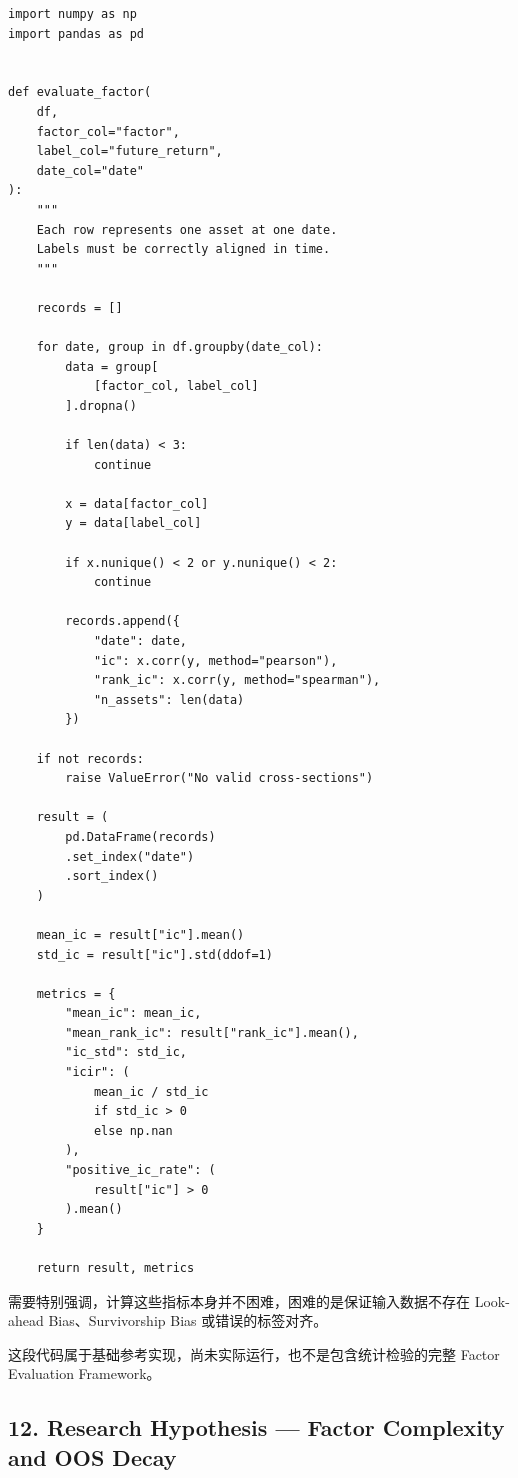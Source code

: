 \begin{verbatim}
import numpy as np
import pandas as pd


def evaluate_factor(
    df,
    factor_col="factor",
    label_col="future_return",
    date_col="date"
):
    """
    Each row represents one asset at one date.
    Labels must be correctly aligned in time.
    """

    records = []

    for date, group in df.groupby(date_col):
        data = group[
            [factor_col, label_col]
        ].dropna()

        if len(data) < 3:
            continue

        x = data[factor_col]
        y = data[label_col]

        if x.nunique() < 2 or y.nunique() < 2:
            continue

        records.append({
            "date": date,
            "ic": x.corr(y, method="pearson"),
            "rank_ic": x.corr(y, method="spearman"),
            "n_assets": len(data)
        })

    if not records:
        raise ValueError("No valid cross-sections")

    result = (
        pd.DataFrame(records)
        .set_index("date")
        .sort_index()
    )

    mean_ic = result["ic"].mean()
    std_ic = result["ic"].std(ddof=1)

    metrics = {
        "mean_ic": mean_ic,
        "mean_rank_ic": result["rank_ic"].mean(),
        "ic_std": std_ic,
        "icir": (
            mean_ic / std_ic
            if std_ic > 0
            else np.nan
        ),
        "positive_ic_rate": (
            result["ic"] > 0
        ).mean()
    }

    return result, metrics
\end{verbatim}

需要特别强调，计算这些指标本身并不困难，困难的是保证输入数据不存在 Look-ahead Bias、Survivorship Bias 或错误的标签对齐。

这段代码属于基础参考实现，尚未实际运行，也不是包含统计检验的完整 Factor Evaluation Framework。

\hypertarget{part-4-63-0001-research-hypothesis-factor-complexity-and-oos-decay}{%
\subsection{12. Research Hypothesis --- Factor Complexity and OOS Decay}\label{part-4-63-0001-research-hypothesis-factor-complexity-and-oos-decay}}

